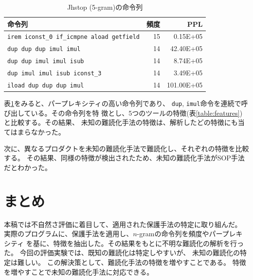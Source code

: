 \documentclass[12pt,twoside]{jreport}
\begin{document}
\begin{table}[t]
  \centering
  \footnotesize{
    \caption{Jhstop (5-gram)の命令列}\label{table:jhstop}
  \begin{tabular}{l|r|r}
   命令列 & 頻度 & PPL\\ \hline
    \texttt{irem iconst\_0 if\_icmpne aload getfield} & 15 &   0.15E+05 \\
    \texttt{dup dup dup imul imul}                    & 14 &  42.40E+05 \\
    \texttt{dup dup imul imul isub}                   & 14 &   8.74E+05 \\
    \texttt{dup imul imul isub iconst\_3}             & 14 &   3.49E+05 \\
    \texttt{iload dup dup dup imul}                   & 14 & 101.00E+05 \\
    \end{tabular}}
\end{table}

表\ref{table:jhstop}をみると、パープレキシティの高い命令列であり、
\texttt{dup}, \texttt{imul}命令を連続で呼び出している。その命令列を特
徴とし、5つのツールの特徴(表\ref{table:features})と比較する。その結果、
未知の難読化手法の特徴は、解析したどの特徴にも当てはまらなかった。

次に、異なるプロダクトを未知の難読化手法で難読化し、それぞれの特徴を比較する。
その結果、同様の特徴が検出されたため、未知の難読化手法がSOP手法だとわかった。

\chapter{まとめ}

本稿では不自然さ評価に着目して、適用された保護手法の特定に取り組んだ。
実際のプログラムに、保護手法を適用し、$n$-gramの命令列を頻度やパープレキシティ
を基に、特徴を抽出した。その結果をもとに不明な難読化の解析を行った。
今回の評価実験では、既知の難読化は特定しやすいが、
未知の難読化の特定は難しい。
この解決策として、難読化手法の特徴を増やすことである。
特徴を増やすことで未知の難読化手法に対応できる。


 
 

\appendix
\end{document}
